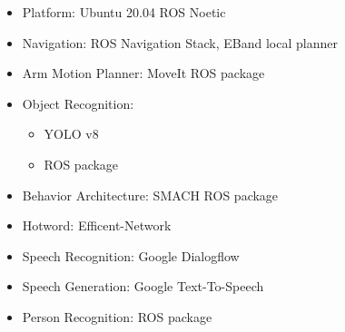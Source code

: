 \begin{itemize}
	\item Platform: Ubuntu 20.04 ROS Noetic
	\item Navigation: ROS Navigation Stack, EBand local planner
	\item Arm Motion Planner: MoveIt ROS package
	\item Object Recognition:
	      \begin{itemize}
		      \item YOLO v8
		      \item {} ROS package
	      \end{itemize}
	\item Behavior Architecture: SMACH ROS package
	\item Hotword: Efficent-Network
	\item Speech Recognition: Google Dialogflow
	\item Speech Generation: Google Text-To-Speech
	\item Person Recognition:  ROS package
\end{itemize}
